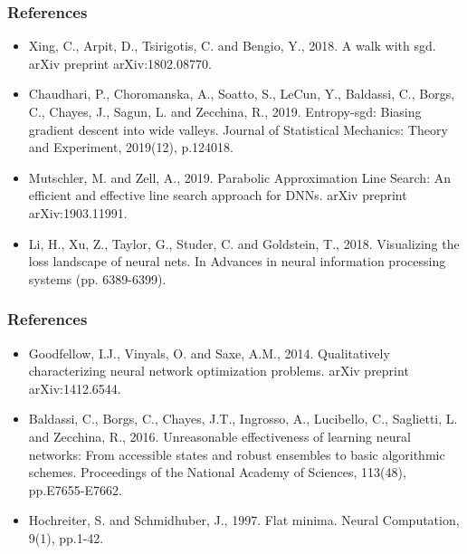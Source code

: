 \documentclass[9pt]{beamer}
\begin{document}
\begin{frame}
\frametitle{References}
\begin{itemize}%
	\item Xing, C., Arpit, D., Tsirigotis, C. and Bengio, Y., 2018. A walk with sgd. arXiv preprint arXiv:1802.08770.
	\item Chaudhari, P., Choromanska, A., Soatto, S., LeCun, Y., Baldassi, C., Borgs, C., Chayes, J., Sagun, L. and Zecchina, R., 2019. Entropy-sgd: Biasing gradient descent into wide valleys. Journal of Statistical Mechanics: Theory and Experiment, 2019(12), p.124018.
	\item Mutschler, M. and Zell, A., 2019. Parabolic Approximation Line Search: An efficient and effective line search approach for DNNs. arXiv preprint arXiv:1903.11991.
	\item Li, H., Xu, Z., Taylor, G., Studer, C. and Goldstein, T., 2018. Visualizing the loss landscape of neural nets. In Advances in neural information processing systems (pp. 6389-6399).
\end{itemize}
\end{frame} 
\begin{frame}
\frametitle{References}
\begin{itemize}%
	\item Goodfellow, I.J., Vinyals, O. and Saxe, A.M., 2014. Qualitatively characterizing neural network optimization problems. arXiv preprint arXiv:1412.6544.
	\item Baldassi, C., Borgs, C., Chayes, J.T., Ingrosso, A., Lucibello, C., Saglietti, L. and Zecchina, R., 2016. Unreasonable effectiveness of learning neural networks: From accessible states and robust ensembles to basic algorithmic schemes. Proceedings of the National Academy of Sciences, 113(48), pp.E7655-E7662.
	\item Hochreiter, S. and Schmidhuber, J., 1997. Flat minima. Neural Computation, 9(1), pp.1-42.
\end{itemize}
\end{frame} 
\end{document}
